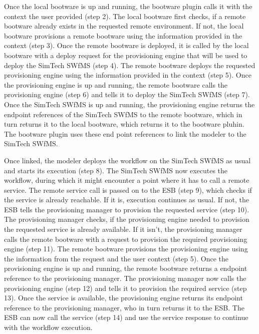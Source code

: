 Once the local bootware is up and running, the bootware plugin calls it with the context the user provided (step 2).
The local bootware first checks, if a remote bootware already exists in the requested remote environment.
If not, the local bootware provisions a remote bootware using the information provided in the context (step 3).
Once the remote bootware is deployed, it is called by the local bootware with a deploy request for the provisioning engine that will be used to deploy the SimTech SWfMS (step 4).
The remote bootware deploys the requested provisioning engine using the information provided in the context (step 5).
Once the provisioning engine is up and running, the remote bootware calls the provisioning engine (step 6) and tells it to deploy the SimTech SWfMS (step 7).
Once the SimTech SWfMS is up and running, the provisioning engine returns the endpoint references of the SimTech SWfMS to the remote bootware, which in turn returns it to the local bootware, which returns it to the bootware pluhin.
The bootware plugin uses these end point references to link the modeler to the SimTech SWfMS.

Once linked, the modeler deploys the workflow on the SimTech SWfMS as usual and starts its execution (step 8).
The SimTech SWfMS now executes the workflow, during which it might encounter a point where it has to call a remote service.
The remote service call is passed on to the ESB (step 9), which checks if the service is already reachable.
If it is, execution continues as usual.
If not, the ESB tells the provisioning manager to provision the requested service (step 10).
The provisioning manager checks, if the provisioning engine needed to provision the requested service is already available.
If it isn't, the provisioning manager calls the remote bootware with a request to provision the required provisioning engine (step 11).
The remote bootware provisions the provisioning engine using the information from the request and the user context (step 5).
Once the provisioning engine is up and running, the remote bootware returns a endpoint reference to the provisioning manager.
The provisioning manager now calls the provisioning engine (step 12) and tells it to provision the required service (step 13).
Once the service is available, the provisioning engine returns its endpoint reference to the provisioning manager, who in turn returns it to the ESB.
The ESB can now call the service (step 14) and use the service response to continue with the workflow execution.

